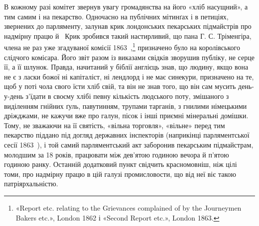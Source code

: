 В кожному разі комітет звернув увагу громадянства на його
«хліб насущний», а тим самим і на пекарство. Одночасно на публічних
мітинґах і в петиціях, звернених до парляменту, залунав
крик лондонських пекарських підмайстрів про надмірну працю
й~ Крик зробився такий настирливий, що пана Г. С. Тріменгіра,
члена не раз уже згадуваної комісії 1863~,\footnote{
«Report etc. relating to the Grievances complained of by the
Journeymen Bakers etc.», London 1862 і «Second Report etc.», London
1863.
} призначено
було на королівського слідчого комісара. Його звіт разом із виказами
свідків зворушив публіку, не серце її, а її шлунок. Правда,
начитаний у біблії англієць знав, що людину, якщо вона не є з
ласки божої ні капіталіст, ні лендлорд і не має синекури, призначено
на те, щоб у поті чола свого їсти хліб свій, та він не знав
того, що він сам мусить день-у-день з’їдати в своєму хлібі
певну кількість людського поту, змішаного з виділенням гнійних
ґуль, павутинням, трупами тарганів, з гнилими німецькими дріжджами,
не кажучи вже про галун, пісок і інші приємні мінеральні
домішки. Тому, не зважаючи на її святість, «вільна торговля»,
«вільне» перед тим пекарство піддано під догляд державних
інспекторів (наприкінці парляментської сесії 1863~), і той самий
парляментський акт заборонив пекарським підмайстрам, молодшим
за 18 років, працювати між дев’ятою годиною вечора й п’ятою
годиною ранку. Останній додатковий пункт свідчить красномовніш,
ніж цілі томи, про надмірну працю в цій галузі промисловости,
що від неї віє такою патріярхальністю.

